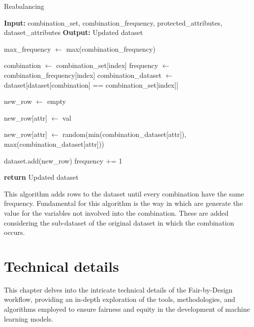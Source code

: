 \documentclass[12pt,a4paper,openright,twoside]{book}
\begin{document}
\begin{algorithm}[H]
    \caption{Reabalancing}
    \begin{algorithmic}[1]
        \State \textbf{Input:} combination\_set, combination\_frequency, protected\_attributes, dataset\_attributes
        \State \textbf{Output:} Updated dataset

        \State max\_frequency $\gets$ max(combination\_frequency)

            \State combination $\gets$ combination\_set[index]
            \State frequency $\gets$ combination\_frequency[index]
            \State combination\_dataset $\gets$ dataset[dataset[combination] == combination\_set[index]]

                \State new\_row $\gets$ empty

                    \State new\_row[attr] $\gets$ val
                \EndFor

                    \State new\_row[attr] $\gets$ random(min(combination\_dataset[attr]), max(combination\_dataset[attr]))
                \EndFor

                \State dataset.add(new\_row)
                \State frequency $+$= 1
            \EndWhile
        \EndFor

        \State \textbf{return} Updated dataset
    \end{algorithmic}
\end{algorithm}

This algorithm adds rows to the dataset until every combination have the same frequency. Fundamental for this algorithm is the way in which are generate the value for the variables not involved into the combination. These are added considering the sub-dataset of the original dataset in which the combination occurs. 


\chapter{Technical details}
\label{chap:technical}

This chapter delves into the intricate technical details of the Fair-by-Design workflow, providing an in-depth exploration of the tools, methodologies, and algorithms employed to ensure fairness and equity in the development of machine learning models.
\end{document}
